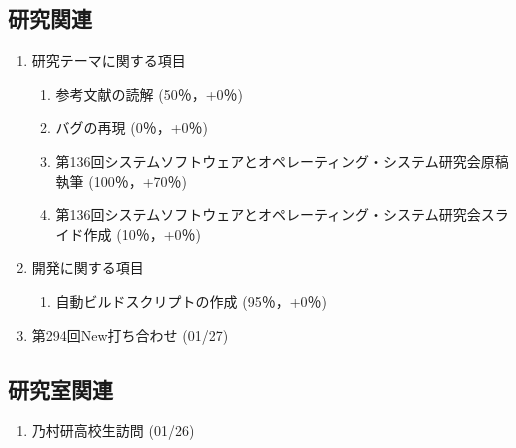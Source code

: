 \documentclass[fleqn, 14pt]{extarticle}
\begin{document}
    \subsection{研究関連}
    \label{sec-2-1}
    \begin{enumerate}

        \item 研究テーマに関する項目
            \hfill
            \label{enum-research1}
            \begin{enumerate}

                \item 参考文献の読解
                    \hfill
                    \label{enum-1-A}
                    (50％，+0％)

                \item バグの再現
                    \hfill
                    \label{enum-1-B}
                    (0％，+0％)

                \item 第136回システムソフトウェアとオペレーティング・システム研究会原稿執筆
                    \hfill
                    \label{enum-1-C}
                    (100％，+70％)

                \item 第136回システムソフトウェアとオペレーティング・システム研究会スライド作成
                    \hfill
                    \label{enum-1-D}
                    (10％，+0％)

            \end{enumerate}

        \item 開発に関する項目
            \hfill
            \label{enum-research2}
            \begin{enumerate}

                \item 自動ビルドスクリプトの作成
                    \hfill
                    \label{enum-2-A}
                    (95％，+0％)

            \end{enumerate}

        \item 第294回New打ち合わせ
            \hfill
            \label{enum-research3}
            (01/27)

    \end{enumerate}
    \subsection{研究室関連}
    \label{sec-2-2}
    \begin{enumerate}

        \item 乃村研高校生訪問
            \hfill
            \label{enum-18}
            (01/26)

    \end{enumerate}
\end{document}
